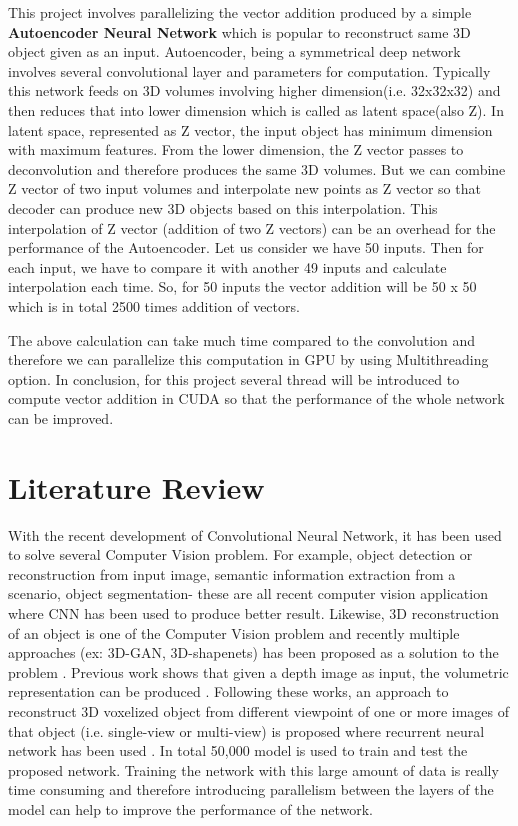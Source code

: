 \documentclass[11pt]{article}       %
\begin{document}
This project involves parallelizing the vector addition produced by a simple \textbf{Autoencoder Neural Network}  which is popular to reconstruct same 3D object given as an input. Autoencoder, being a symmetrical deep network involves several convolutional layer and parameters for computation. Typically this network feeds on 3D volumes involving higher dimension(i.e. 32x32x32) and then reduces that into lower dimension \cite{dr8} which is called as latent space(also Z). In latent space, represented as Z vector, the input object has minimum dimension with maximum features. From the lower dimension, the Z vector passes to deconvolution and therefore produces the same 3D volumes. But we can combine Z vector of two input volumes and interpolate new points as Z vector so that decoder can produce new 3D objects based on this interpolation. This interpolation of Z vector (addition of two Z vectors) can be an overhead for the performance of the Autoencoder. Let us consider we have 50 inputs. Then for each input, we have to compare it with another 49 inputs and calculate interpolation each time. So, for 50 inputs the vector addition will be 50 x 50 which is in total 2500 times addition of vectors.

The above calculation can take much time compared to the convolution and therefore we can parallelize this computation in GPU by using Multithreading option. In conclusion, for this project several thread will be introduced to compute vector addition in CUDA so that the performance of the whole network can be improved.    
 

\section{Literature Review} \label{litrev}

With the recent development of Convolutional Neural Network, it has been used to solve several Computer Vision problem. For example, object detection or reconstruction from input image, semantic information extraction from a scenario, object segmentation- these are all recent computer vision application where CNN has been used to produce better result. Likewise, 3D reconstruction of an object is one of the Computer Vision problem and recently multiple approaches (ex: 3D-GAN, 3D-shapenets) has been proposed as a solution to the problem \cite{dr1}. Previous work shows that given a depth image as input, the volumetric representation can be produced \cite{dr2}. Following these works, an approach to reconstruct 3D voxelized object from different viewpoint of one or more images of that object (i.e. single-view or multi-view) is proposed where recurrent neural network has been used \cite{dr7}. In total 50,000 model is used to train and test the proposed network. Training the network with this large amount of data is really time consuming and therefore introducing parallelism between the layers of the model can help to improve the performance of the network.
\end{document}
